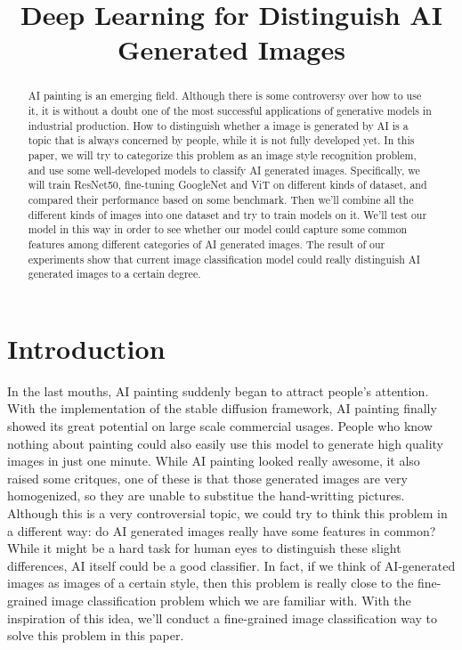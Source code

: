 \documentclass[conference]{IEEEtran}
\begin{document}
\title{Deep Learning for Distinguish AI Generated Images\\
}

\author{
}

\maketitle

\begin{abstract}
AI painting is an emerging field. Although there is some controversy over how to use it,
it is without a doubt one of the most successful applications of generative models in industrial production.
How to distinguish whether a image is generated by AI is a topic that is always concerned by people, while it is
not fully developed yet. In this paper, we will try to categorize this problem as an image style recognition problem,
and use some well-developed models to classify AI generated images. Specifically, we will train ResNet50, fine-tuning
GoogleNet and ViT on different kinds of dataset, and compared their performance based on some benchmark. Then we'll combine
all the different kinds of images into one dataset and try to train models on it. We'll test our model in this way in order
to see whether our model could capture some common features among different categories of AI generated images. The result of
our experiments show that current image classification model could really distinguish AI generated images to a certain degree.
\end{abstract}

\section{Introduction}
In the last mouths, AI painting suddenly began to attract people's attention. With the implementation of the stable diffusion framework, AI painting
finally showed its great potential on large scale commercial usages. People who know nothing about painting could also easily use this model to generate
high quality images in just one minute. While AI painting looked really awesome, it also raised some critques, one of these is that those generated images are
very homogenized, so they are unable to substitue the hand-writting pictures. Although this is a very controversial topic, we could try to think this problem in
a different way: do AI generated images really have some features in common? While it might be a hard task for human eyes to distinguish these slight differences,
AI itself could be a good classifier. In fact, if we think of AI-generated images as images of a certain style, then this problem is really close to the fine-grained
image classification problem which we are familiar with. With the inspiration of this idea, we'll conduct a fine-grained image classification way to solve this problem in this paper.
\end{document}
